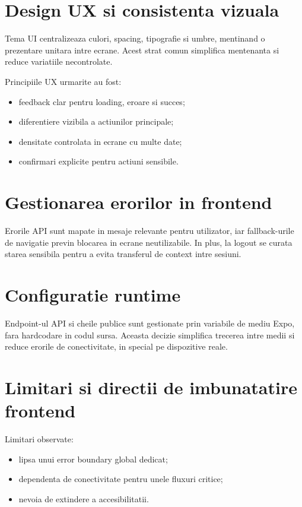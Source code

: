 \section{Design UX si consistenta vizuala}

Tema UI centralizeaza culori, spacing, tipografie si umbre, mentinand o prezentare unitara intre ecrane. Acest strat comun simplifica mentenanta si reduce variatiile necontrolate.

Principiile UX urmarite au fost:
\begin{itemize}[leftmargin=1.2cm]
    \item feedback clar pentru loading, eroare si succes;
    \item diferentiere vizibila a actiunilor principale;
    \item densitate controlata in ecrane cu multe date;
    \item confirmari explicite pentru actiuni sensibile.
\end{itemize}

\section{Gestionarea erorilor in frontend}

Erorile API sunt mapate in mesaje relevante pentru utilizator, iar fallback-urile de navigatie previn blocarea in ecrane neutilizabile. In plus, la logout se curata starea sensibila pentru a evita transferul de context intre sesiuni.

\section{Configuratie runtime}

Endpoint-ul API si cheile publice sunt gestionate prin variabile de mediu Expo, fara hardcodare in codul sursa. Aceasta decizie simplifica trecerea intre medii si reduce erorile de conectivitate, in special pe dispozitive reale.

\section{Limitari si directii de imbunatatire frontend}

Limitari observate:
\begin{itemize}[leftmargin=1.2cm]
    \item lipsa unui error boundary global dedicat;
    \item dependenta de conectivitate pentru unele fluxuri critice;
    \item nevoia de extindere a accesibilitatii.
\end{itemize}

